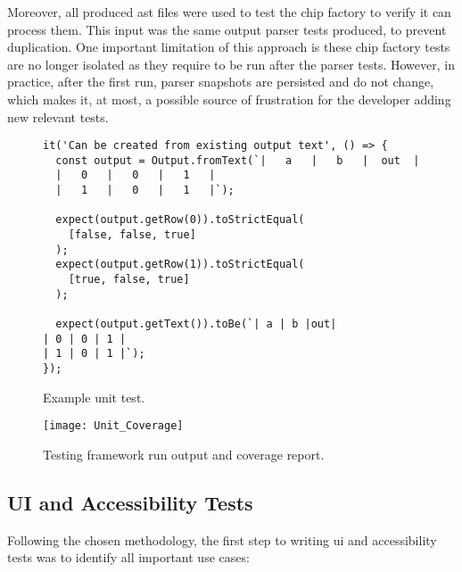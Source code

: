 Moreover, all produced \gls{ast} files were used to test the chip factory to verify it can process them.
This input was the same output parser tests produced, to prevent duplication.
One important limitation of this approach is these chip factory tests are no longer isolated as they require to be run after the parser tests.
However, in practice, after the first run, parser snapshots are persisted and do not change, which makes it, at most, a possible source of frustration for the developer adding new relevant tests.

\begin{figure}[H]
\centering
\begin{verbatim}
it('Can be created from existing output text', () => {
  const output = Output.fromText(`|   a   |   b   |  out  |
  |   0   |   0   |   1   |
  |   1   |   0   |   1   |`);

  expect(output.getRow(0)).toStrictEqual(
    [false, false, true]
  );
  expect(output.getRow(1)).toStrictEqual(
    [true, false, true]
  );

  expect(output.getText()).toBe(`| a | b |out|
| 0 | 0 | 1 |
| 1 | 0 | 1 |`);
});
\end{verbatim}
    \caption{Example unit test.}
    \label{fig:test-unit-example}
\end{figure}

\begin{figure}[H]
    \texttt{[image: Unit\_Coverage]}
    \caption{Testing framework run output and coverage report.}
    \label{fig:test-coverage}
\end{figure}

\subsection{UI and Accessibility Tests}

Following the chosen methodology, the first step to writing \gls{ui} and accessibility tests was to identify all important use cases:


